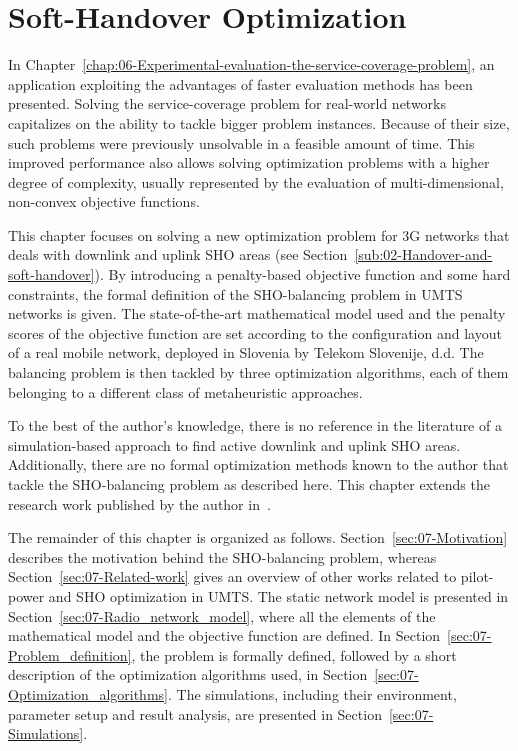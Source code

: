 
\chapter{Soft-Handover Optimization \label{chap:07-Experimental-evaluation-the-SHO-alignment-problem}}


\noindent In Chapter~\ref{chap:06-Experimental-evaluation-the-service-coverage-problem},
an application exploiting the advantages of faster evaluation methods
has been presented. Solving the service-coverage problem for real-world
networks capitalizes on the ability to tackle bigger problem instances.
Because of their size, such problems were previously unsolvable in
a feasible amount of time. This improved performance also allows solving
optimization problems with a higher degree of complexity, usually
represented by the evaluation of multi-dimensional, non-convex objective
functions.

\noindent This chapter focuses on solving a new optimization problem
for 3G networks that deals with downlink and uplink SHO areas (see
Section~\ref{sub:02-Handover-and-soft-handover}). By introducing
a penalty-based objective function and some hard constraints, the
formal definition of the SHO-balancing problem in UMTS networks is
given. The state-of-the-art mathematical model used and the penalty
scores of the objective function are set according to the configuration
and layout of a real mobile network, deployed in Slovenia by Telekom
Slovenije, d.d. The balancing problem is then tackled by three optimization
algorithms, each of them belonging to a different class of metaheuristic
approaches.

To the best of the author's knowledge, there is no reference in the
literature of a simulation-based approach to find active downlink
and uplink SHO areas. Additionally, there are no formal optimization
methods known to the author that tackle the SHO-balancing problem
as described here. This chapter extends the research work published
by the author in~\cite{Benedicic_Balancing_downlink_uplink_soft_handover_areas_in_UMTS_networks:2012}.

The remainder of this chapter is organized as follows. Section~\ref{sec:07-Motivation}
describes the motivation behind the SHO-balancing problem, whereas
Section~\ref{sec:07-Related-work} gives an overview of other works
related to pilot-power and SHO optimization in UMTS. The static network
model is presented in Section~\ref{sec:07-Radio_network_model},
where all the elements of the mathematical model and the objective
function are defined. In Section~\ref{sec:07-Problem_definition},
the problem is formally defined, followed by a short description of
the optimization algorithms used, in Section~\ref{sec:07-Optimization_algorithms}.
The simulations, including their environment, parameter setup and
result analysis, are presented in Section~\ref{sec:07-Simulations}.



